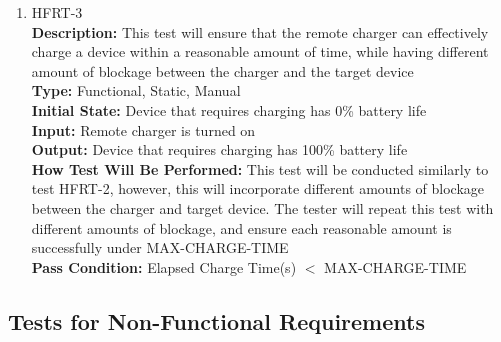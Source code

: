 \documentclass[12pt, titlepage]{article}
\begin{document}
\begin{enumerate}
    \item{HFRT-3\\}
    \textbf{Description:} This test will ensure that the remote charger can effectively charge a device within a reasonable amount of time, while having different amount of blockage between the charger and the target device\\
    \textbf{Type:} Functional, Static, Manual\\
    \textbf{Initial State:} Device that requires charging has 0\% battery life\\
    \textbf{Input:} Remote charger is turned on\\
    \textbf{Output:} Device that requires charging has 100\% battery life\\
    \textbf{How Test Will Be Performed:} This test will be conducted similarly to test HFRT-2, however, this will incorporate different amounts of blockage between the charger and target device. The tester will repeat this test with different amounts of blockage, and ensure each reasonable amount is successfully under MAX-CHARGE-TIME\\
    \textbf{Pass Condition:} Elapsed Charge Time(s) $<$ MAX-CHARGE-TIME\\
\end{enumerate}

\subsection{Tests for Non-Functional Requirements}
\end{document}

